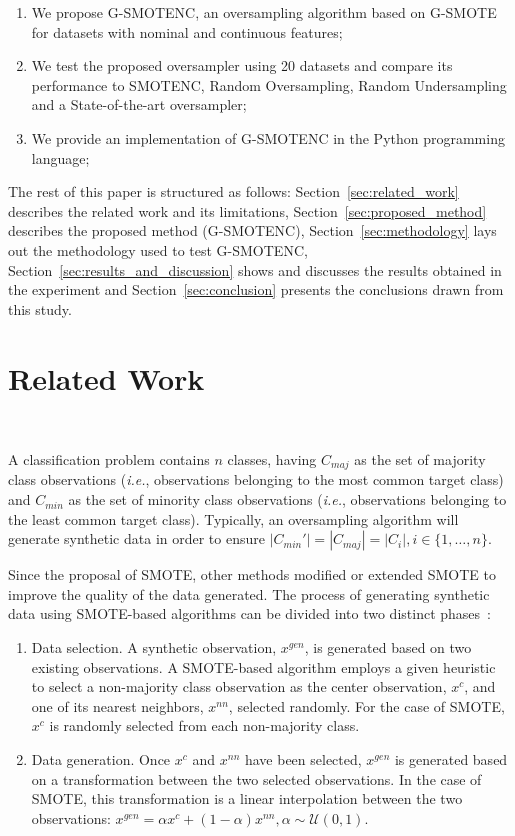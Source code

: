 \documentclass[preprint,12pt]{elsarticle}
\begin{document}
{\begin{enumerate}
    \item We propose G-SMOTENC, an oversampling algorithm based on G-SMOTE for
        datasets with nominal and continuous features;
    \item We test the proposed oversampler using 20 datasets and compare its
        performance to SMOTENC, Random Oversampling, Random Undersampling and
        a State-of-the-art oversampler;
    \item We provide an implementation of G-SMOTENC in the Python programming
        language;
\end{enumerate}

The rest of this paper is structured as follows:
Section~\ref{sec:related_work} describes the related work and its limitations,
Section~\ref{sec:proposed_method} describes the proposed
method (G-SMOTENC), Section~\ref{sec:methodology} lays out the methodology
used to test G-SMOTENC, Section~\ref{sec:results_and_discussion} shows and
discusses the results obtained in the experiment and
Section~\ref{sec:conclusion} presents the conclusions drawn from this study.


\section{Related Work}~\label{sec:related_work}

A classification problem contains $n$ classes, having $C_{maj}$ as the set of
majority class observations (\textit{i.e.}, observations belonging to the most
common target class) and $C_{min}$ as the set of minority class observations
(\textit{i.e.}, observations belonging to the least common target class).
Typically, an oversampling algorithm will generate synthetic data in order to
ensure $|C_{min}'|=|C_{maj}|=|C_i|, i \in \{1, \ldots, n\}$.

Since the proposal of SMOTE, other methods modified or extended SMOTE to
improve the quality of the data generated. The process of generating synthetic
data using SMOTE-based algorithms can be divided into two distinct
phases~\cite{fernandez2018smote}:

\begin{enumerate}
    \item Data selection. A synthetic observation, $x^{gen}$, is generated
        based on two existing observations. A SMOTE-based algorithm employs a
        given heuristic to select a non-majority class observation as the
        center observation, $x^c$, and one of its nearest neighbors, $x^{nn}$,
        selected randomly. For the case of SMOTE, $x^c$ is randomly selected
        from each non-majority class.
    \item Data generation. Once $x^c$ and $x^{nn}$ have been selected, $x^{gen}$
        is generated based on a transformation between the two selected
        observations. In the case of SMOTE, this transformation is 
        a linear interpolation between the two observations: $x^{gen} = \alpha x^c
        + (1-\alpha) x^{nn}, \alpha \sim \mathcal{U}(0, 1)$.
\end{enumerate}

}
\end{document}
